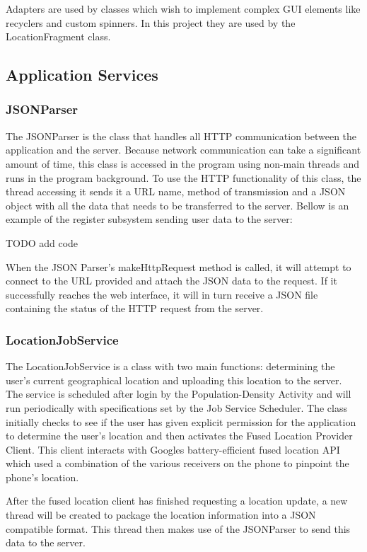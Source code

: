 Adapters are used by classes which wish to implement complex GUI elements like recyclers and custom spinners. In this project they are used by the LocationFragment class. 

\subsection{Application Services} 
\label{sec:app_services}

\subsubsection{JSONParser}
The JSONParser is the class that handles all HTTP communication between the application and the server. Because network communication can take a significant amount of time, this class is accessed in the program using non-main threads and runs in the program background. To use the HTTP functionality of this class, the thread accessing it sends it a URL name, method of transmission and a JSON object with all the data that needs to be transferred to the server. Bellow is an example of the register subsystem sending user data to the server:

TODO add code

When the JSON Parser’s makeHttpRequest method is called, it will attempt to connect to the URL provided and attach the JSON data to the request. If it successfully reaches the web interface, it will in turn receive a JSON file containing the status of the HTTP request from the server.

\subsubsection{LocationJobService}
The LocationJobService is a class with two main functions: determining the user’s current geographical location and uploading this location to the server. The service is scheduled after login by the Population-Density Activity and will run periodically with specifications set by the Job Service Scheduler. The class initially checks to see if the user has given explicit permission for the application to determine the user’s location and then activates the Fused Location Provider Client. This client interacts with Googles battery-efficient fused location API which used a combination of the various receivers on the phone to pinpoint the phone’s location.

After the fused location client has finished requesting a location update, a new thread will be created to package the location information into a JSON compatible format. This thread then makes use of the JSONParser to send this data to the server.

